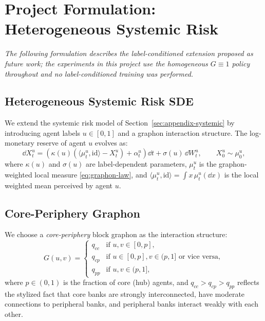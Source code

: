 \documentclass[11pt]{article}
\begin{document}
\section{Project Formulation: Heterogeneous Systemic Risk}\label{sec:appendix-formulation}

\emph{The following formulation describes the label-conditioned extension proposed as future work; the experiments in this project use the homogeneous $G \equiv 1$ policy throughout and no label-conditioned training was performed.}

\subsection{Heterogeneous Systemic Risk SDE}

We extend the systemic risk model of Section~\ref{sec:appendix-systemic} by introducing agent labels $u \in [0,1]$ and a graphon interaction structure. The log-monetary reserve of agent $u$ evolves as:
\begin{equation}\label{eq:hetero-sde}
  \dd X_t^u = \left(\kappa(u)\left(\langle \mu_t^u, \mathrm{id}\rangle - X_t^u\right) + \alpha_t^u\right)\dd t + \sigma(u)\,\dd W_t^u, \qquad X_0^u \sim \mu_0^u,
\end{equation}
where $\kappa(u)$ and $\sigma(u)$ are label-dependent parameters, $\mu_t^u$ is the graphon-weighted local measure \eqref{eq:graphon-law}, and $\langle \mu_t^u, \mathrm{id} \rangle = \int x\,\mu_t^u(\dd x)$ is the local weighted mean perceived by agent $u$.

\subsection{Core-Periphery Graphon}

We choose a \emph{core-periphery} block graphon as the interaction structure:
\begin{equation}\label{eq:core-periphery}
  G(u,v) = \begin{cases}
    q_{cc} & \text{if } u,v \in [0, p], \\
    q_{cp} & \text{if } u \in [0,p], v \in (p,1] \text{ or vice versa}, \\
    q_{pp} & \text{if } u,v \in (p, 1],
  \end{cases}
\end{equation}
where $p \in (0,1)$ is the fraction of core (hub) agents, and $q_{cc} > q_{cp} > q_{pp}$ reflects the stylized fact that core banks are strongly interconnected, have moderate connections to peripheral banks, and peripheral banks interact weakly with each other.
\end{document}
